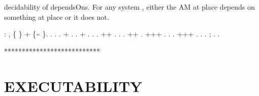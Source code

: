 \documentclass[12pt]{report}
\begin{document}
decidability of dependsOns. For any system , either the AM at place  depends on something at place  or it does not. 
\begin{coqdoccode}
\coqdocemptyline
\coqdocnoindent
{}  : \coqdockw{\ensuremath{\forall}}   , \{   \} + \{\~{}    \}.\coqdoceol
\coqdocnoindent
{}.\coqdoceol
\coqdocindent{1.00em}
.  .\coqdoceol
\coqdocindent{1.00em}
+ . .\coqdoceol
\coqdocindent{1.00em}
+ .      .  .\coqdoceol
\coqdocindent{1.00em}
++ . .  .\coqdoceol
\coqdocindent{1.00em}
++  .\coqdoceol
\coqdocindent{1.00em}
+++ . .  .\coqdoceol
\coqdocindent{1.00em}
+++ .  . .  ; .\coqdoceol
\coqdocnoindent
{}.\coqdoceol
\coqdocemptyline
\end{coqdoccode}
***************************
\section{EXECUTABILITY}
\end{document}
